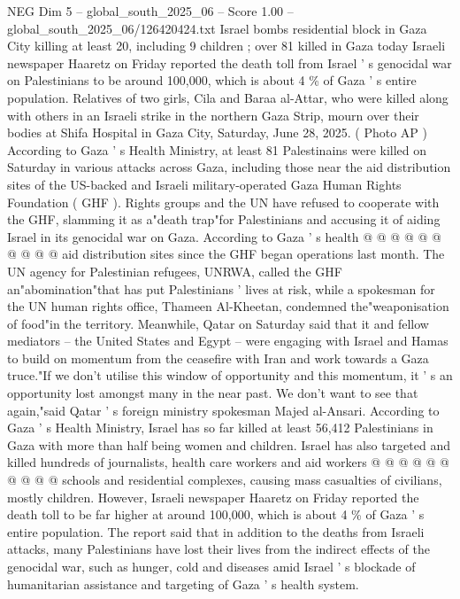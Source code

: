 \begin{textsample}{NEG Dim 5 – global\_south\_2025\_06 – Score 1.00 – global\_south\_2025\_06/126420424.txt}  \label{ex:f5_neg_416}
Israel bombs residential block in Gaza City killing at least 20, including 9 children ; over 81 killed in Gaza today Israeli newspaper Haaretz on Friday reported the death toll from Israel ' s genocidal war on Palestinians to be around 100,000, which is about 4 \% of Gaza ' s entire population.
Relatives of two girls, Cila and Baraa al-Attar, who were killed along with others in an Israeli strike in the northern Gaza Strip, mourn over their bodies at Shifa Hospital in Gaza City, Saturday, June 28, 2025. ( Photo AP ) According to Gaza ' s Health Ministry, at least 81 Palestinains were killed on Saturday in various attacks across Gaza, including those near the aid distribution sites of the US-backed and Israeli military-operated Gaza Human Rights Foundation ( GHF ).
Rights groups and the UN have refused to cooperate with the GHF, slamming it as a"death trap"for Palestinians and accusing it of aiding Israel in its genocidal war on Gaza.
According to Gaza ' s health @ @ @ @ @ @ @ @ @ @ aid distribution sites since the GHF began operations last month.
The UN agency for Palestinian refugees, UNRWA, called the GHF an"abomination"that has put Palestinians ' lives at risk, while a spokesman for the UN human rights office, Thameen Al-Kheetan, condemned the"weaponisation of food"in the territory.
Meanwhile, Qatar on Saturday said that it and fellow mediators -- the United States and Egypt -- were engaging with Israel and Hamas to build on momentum from the ceasefire with Iran and work towards a Gaza truce."If we don't utilise this window of opportunity and this momentum, it ' s an opportunity lost amongst many in the near past.
We don't want to see that again,"said Qatar ' s foreign ministry spokesman Majed al-Ansari.
According to Gaza ' s Health Ministry, Israel has so far killed at least 56,412 Palestinians in Gaza with more than half being women and children.
Israel has also targeted and killed hundreds of journalists, health care workers and aid workers @ @ @ @ @ @ @ @ @ @ schools and residential complexes, causing mass casualties of civilians, mostly children.
However, Israeli newspaper Haaretz on Friday reported the death toll to be far higher at around 100,000, which is about 4 \% of Gaza ' s entire population.
The report said that in addition to the deaths from Israeli attacks, many Palestinians have lost their lives from the indirect effects of the genocidal war, such as hunger, cold and diseases amid Israel ' s blockade of humanitarian assistance and targeting of Gaza ' s health system.

\end{textsample}
